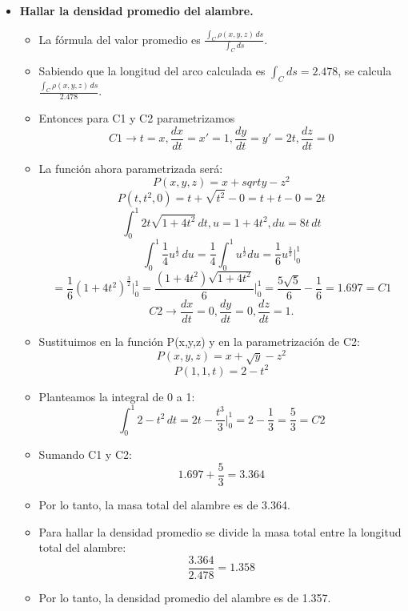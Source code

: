 \documentclass{article}
\begin{document}
\begin{itemize}
    \item \textbf{Hallar la densidad promedio del alambre.}
    \begin{itemize}
        \item La fórmula del valor promedio es \( \frac{\int_{C} \rho(x, y, z) \, ds}{\int_{C} ds} \).
        \item Sabiendo que la longitud del arco calculada es \( \int_{C} ds = 2.478 \), se calcula \( \frac{\int_{C} \rho(x, y, z) \, ds}{2.478} \).
        \item Entonces para C1 y C2 parametrizamos
        \[
            C1 \to t=x , \frac{dx}{dt} = x' = 1, \frac{dy}{dt} = y' = 2t, \frac{dz}{dt} = 0
            \]
            \item La función ahora parametrizada será:
            \[
                P(x,y,z)= x + sqrt{y} -z^{2}
                \]
                \[
                    P(t,t^{2},0) = t + \sqrt{t^{2}} - 0 = t + t - 0 = 2t
                    \]
                    \[
                        \int_{0}^{1} 2t \sqrt{1 + 4t^{2}} \, dt , u = 1 + 4t^{2}, du = 8t \, dt
                        \]
                        \[
                            \int_{0}^{1} \frac{1}{4} u^{\frac{1}{2}} \, du = \frac{1}{4} \int_{0}^{1} u^{\frac{1}{2}} du = \frac{1}{6} u^{\frac{3}{2}} \Big|_{0}^{1}
                            \]
                            \[
                                 = \frac{1}{6} (1+4 t^{2})^{\frac{3}{2}} \Big|_{0}^{1} = \frac{(1+4t^{2})\sqrt{1+4t^{2}}}{6} \Big|_{0}^{1} = \frac{5\sqrt{5}}{6} - \frac{1}{6} =  1.697 = C1
                                 \]
        \[
            C2 \to \frac{dx}{dt} = 0, \frac{dy}{dt} = 0, \frac{dz}{dt} = 1 .
            \]
            \item  Sustituimos en la función P(x,y,z) y  en la parametrización de C2:
            \[
                P(x,y,z) = x + \sqrt{y} - z^{2} 
                \]
                \[
                    P(1,1,t) = 2 - t^{2}
                    \]
                    \item Planteamos la integral de 0 a 1:
                    \[
                        \int_{0}^{1} 2 - t^{2} \, dt = 2t - \frac{t^{3}}{3} \Big|_{0}^{1} = 2 - \frac{1}{3} = \frac{5}{3} = C2
                        \]
                        \item Sumando C1 y C2:
                        \[
                            1.697 + \frac{5}{3} = 3.364
                            \]
                            \item Por lo tanto, la masa total del alambre es de 3.364.
                            \item Para hallar la densidad promedio se divide la masa total entre la longitud total del alambre:
                            \[
                                \frac{3.364}{2.478} = 1.358
                                \]
                                \item Por lo tanto, la densidad promedio del alambre es de 1.357.


                      
                
    \end{itemize}
\end{itemize}
\end{document}
